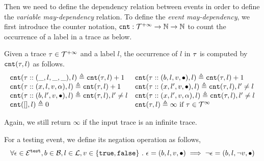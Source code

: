 Then we need to define the dependency relation between events in order to define the \emph{variable may-dependency} relation.
To define the \emph{event may-dependency}, we first introduce the counter notation,
$\mathtt{cnt} : \mathcal{T}^{+\infty} \to \mathbb{N} \to \mathbb{N}$ to count the 
occurrence of a label in a trace as below.
 \begin{defn}
 \label{def:trace_cnt}
 Given a trace $\mathtt{\tau} \in \mathcal{T}^{+\infty}$ and a label $l$, the occurrence of $l$ in $\mathtt{\tau}$ is computed by
 $\mathtt{cnt}(\mathtt{\tau}, l)$ as follows.
 \[
 \begin{array}{ll}
 \mathtt{cnt}(\mathtt{\tau} :: (\_, l, \_, \_), l ) \triangleq \mathtt{cnt}(\mathtt{\tau}, l) + 1
 &
 \mathtt{cnt}(\mathtt{\tau} ::(b, l, v, \bullet), l) \triangleq \mathtt{cnt}(\mathtt{\tau}, l) + 1
 \\
 \mathtt{cnt}(\mathtt{\tau} :: (x, l, v, \alpha), l) \triangleq \mathtt{cnt}(\mathtt{\tau}, l) + 1
 &
 \mathtt{cnt}(\mathtt{\tau} :: (x, l', v, \bullet), l) \triangleq \mathtt{cnt}(\mathtt{\tau}, l), l' \neq l
 \\
 \mathtt{cnt}(\mathtt{\tau} :: (b, l', v, \bullet), l) \triangleq \mathtt{cnt}(\mathtt{\tau}, l), l' \neq l
 &
 \mathtt{cnt}(\mathtt{\tau} :: (x, l', v, \alpha), l) \triangleq \mathtt{cnt}(\mathtt{\tau}, l), l' \neq l
 \\
 \mathtt{cnt}({[]}, l) \triangleq 0
 &
 \mathtt{cnt}(\mathtt{\tau}, l) \triangleq \infty ~ \text{if}~ \mathtt{\tau} \in \mathcal{T}^{\infty}
 \end{array}
 \]
\end{defn}
Again, we still return $\infty$ if the input trace is an infinite trace.

\begin{defn}
 \label{def:adapt_boolevent_neg}
 For a testing event, we define its negation operation as follows,
 \[
 \forall \mathtt{\epsilon} \in \mathcal{E}^{\mathtt{{test}}}, b \in \mathcal{B}, l \in \mathcal{L},
 v \in \{\mathtt{true}, \mathtt{false}\} ~.~ 
 \mathtt{\epsilon} = (b, l, v, \bullet) \implies
 \neg\mathtt{\epsilon} = (b, l, \neg v, \bullet)\]
\end{defn}

